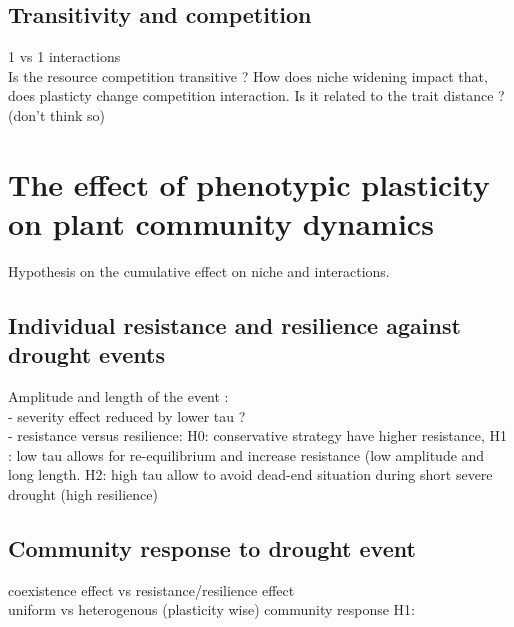 \documentclass[english,10pt]{article}
\begin{document}
\subsection{Transitivity and competition}
1 vs 1 interactions\\
Is the resource competition transitive ? How does niche widening impact that, does plasticty change competition interaction. Is it related to the trait distance ? (don't think so)

\section{The effect of phenotypic plasticity on plant community dynamics}
Hypothesis on the cumulative effect on niche and interactions.

\subsection{Individual resistance and resilience against drought events}
Amplitude and length of the event :\\
- severity effect reduced by lower tau ?\\
- resistance versus resilience: H0: conservative strategy have higher resistance, H1 : low tau allows for re-equilibrium and increase resistance (low amplitude and long length. H2: high tau allow to avoid dead-end situation during short severe drought (high resilience)
\subsection{Community response to drought event}
coexistence effect vs resistance/resilience effect\\
uniform vs heterogenous (plasticity wise) community response
H1: 


 \nocite{TitlesOn}
 
 


  
\end{document}
